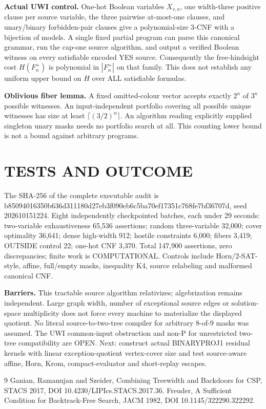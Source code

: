 \documentclass{article}
\begin{document}
\noindent\textbf{Actual UWI control.} One-hot Boolean variables $X_{v,a}$, one width-three positive clause per source variable, the three pairwise at-most-one clauses, and unary/binary forbidden-pair clauses give a polynomial-size 3-CNF with a bijection of models. A single fixed partial program can parse this canonical grammar, run the cap-one source algorithm, and output a verified Boolean witness on every satisfiable encoded YES source. Consequently the free-hindsight cost $H(F_n^+)$ is polynomial in $|F_n^+|$ on that family. This does not establish any uniform upper bound on $H$ over ALL satisfiable formulas.

\noindent\textbf{Oblivious fiber lemma.} A fixed omitted-colour vector accepts exactly $2^n$ of $3^n$ possible witnesses. An input-independent portfolio covering all possible unique witnesses has size at least $\lceil(3/2)^n\rceil$. An algorithm reading explicitly supplied singleton unary masks needs no portfolio search at all. This counting lower bound is not a bound against arbitrary programs.

\section{TESTS AND OUTCOME}
The SHA-256 of the complete executable audit is b85094016350b636d311180d27eb3f090eb6c5ba70ef17351c768fe7bf36707d, seed 202610151224. Eight independently checkpointed batches, each under 29 seconds: two-variable exhaustiveness 65,536 assertions; random three-variable 32,000; cover optimality 36,641; dense high-width 912; hostile constraints 6,000; fibers 3,419; OUTSIDE control 22; one-hot CNF 3,370. Total 147,900 assertions, zero discrepancies; finite work is COMPUTATIONAL. Controls include Horn/2-SAT-style, affine, full/empty masks, inequality K4, source relabeling and malformed canonical CNF.

\noindent\textbf{Barriers.} This tractable source algorithm relativizes; algebrization remains independent. Large graph width, number of exceptional source edges or solution-space multiplicity does not force every machine to materialize the displayed quotient. No literal source-to-two-tree compiler for arbitrary 8-of-9 masks was assumed. The UWI common-input obstruction and non-P for unrestricted two-tree compatibility are OPEN. Next: construct actual BINARYPROJ1 residual kernels with linear exception-quotient vertex-cover size and test source-aware affine, Horn, Krom, compact-evaluator and short-replay escapes.

\begin{thebibliography}{9}
 Ganian, Ramanujan and Szeider, Combining Treewidth and Backdoors for CSP, STACS 2017, DOI 10.4230/LIPIcs.STACS.2017.36.
 Freuder, A Sufficient Condition for Backtrack-Free Search, JACM 1982, DOI 10.1145/322290.322292.
\end{thebibliography}
\end{document}
